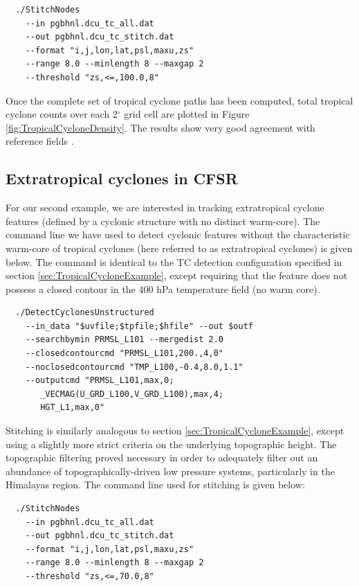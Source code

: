 \documentclass[gmdd, hvmath]{copernicus}
\begin{document}
{\small \begin{verbatim}
  ./StitchNodes
    --in pgbhnl.dcu_tc_all.dat
    --out pgbhnl.dcu_tc_stitch.dat
    --format "i,j,lon,lat,psl,maxu,zs"
    --range 8.0 --minlength 8 --maxgap 2
    --threshold "zs,<=,100.0,8"
\end{verbatim}}

Once the complete set of tropical cyclone paths has been computed, total tropical cyclone counts over each 2$^\circ$ grid cell are plotted in Figure \ref{fig:TropicalCycloneDensity}. The results show very good agreement with reference fields \citep{Gray1968,Knapp2010}.

\subsection{Extratropical cyclones in CFSR} \label{sec:ExtratropicalCycloneExample}

For our second example, we are interested in tracking extratropical cyclone features (defined by a cyclonic structure with no distinct warm-core).  The command line we have used to detect cyclonic features without the characteristic warm-core of tropical cyclones (here referred to as extratropical cyclones) is given below.  The command is identical to the TC detection configuration specified in section \ref{sec:TropicalCycloneExample}, except requiring that the feature does not possess a closed contour in the 400 hPa temperature field (no warm core).

{\small \begin{verbatim}
  ./DetectCyclonesUnstructured
    --in_data "$uvfile;$tpfile;$hfile" --out $outf
    --searchbymin PRMSL_L101 --mergedist 2.0
    --closedcontourcmd "PRMSL_L101,200.,4,0"
    --noclosedcontourcmd "TMP_L100,-0.4,8.0,1.1"
    --outputcmd "PRMSL_L101,max,0;
       _VECMAG(U_GRD_L100,V_GRD_L100),max,4;
       HGT_L1,max,0"
\end{verbatim}}

Stitching is similarly analogous to section \ref{sec:TropicalCycloneExample}, except using a slightly more strict criteria on the underlying topographic height.  The topographic filtering proved necessary in order to adequately filter out an abundance of topographically-driven low pressure systems, particularly in the Himalayas region.  The command line used for stitching is given below:

{\small \begin{verbatim}
  ./StitchNodes
    --in pgbhnl.dcu_tc_all.dat
    --out pgbhnl.dcu_tc_stitch.dat
    --format "i,j,lon,lat,psl,maxu,zs"
    --range 8.0 --minlength 8 --maxgap 2
    --threshold "zs,<=,70.0,8"
\end{verbatim}}
\end{document}
